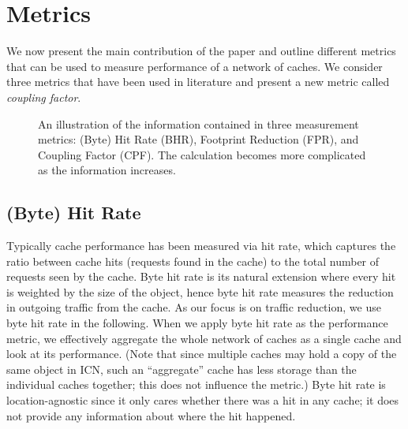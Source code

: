 \documentclass{sigcomm-alternate}
\begin{document}
\section{Metrics}
\label{sec:metrics}

We now present the main contribution of the paper and outline different metrics that can be used to measure performance of a network of caches.
We consider three metrics that have been used in literature and present a new metric called \emph{coupling factor}.



\begin{figure*}[!tb]
  \centering
  \quad
  \quad
  \caption{An illustration of the information contained in three measurement metrics: (Byte) Hit Rate (BHR), Footprint Reduction (FPR), and Coupling Factor (CPF). The calculation becomes more complicated as the information increases.
}
  \label{fig:coupling}
\end{figure*}



\subsection{(Byte) Hit Rate}
\label{sec:hit-rate}

Typically cache performance has been measured via hit rate, which captures the ratio between cache hits (requests found in the cache) to the total number of requests seen by the cache.
Byte hit rate is its natural extension where every hit is weighted by the size of the object, hence byte hit rate measures the reduction in outgoing traffic from the cache.
As our focus is on traffic reduction, we use byte hit rate in the following.
When we apply byte hit rate as the performance metric, we effectively aggregate the whole network of caches as a single cache and look at its performance.
(Note that since multiple caches may hold a copy of the same object in ICN, such an ``aggregate'' cache has less storage than the individual caches together; this does not influence the metric.)
Byte hit rate is location-agnostic since it only cares whether there was a hit in any cache; it does not provide any information about where the hit happened.
\end{document}
